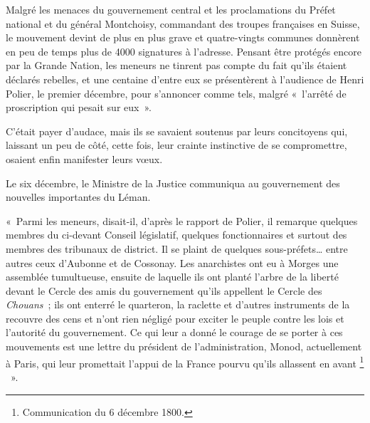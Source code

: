 \documentclass[french,twoside]{book} %
\newenvironment{quoteblock}%
  {\begin{quoting}}
  {\end{quoting}}
\newenvironment{quotebar}{%
    \def\FrameCommand{{\color{rubric!10!}\vrule width 0.5em} \hspace{0.9em}}%
    \def\OuterFrameSep{\itemsep} %
    \MakeFramed {\advance\hsize-\width \FrameRestore}
  }%
  {%
    \endMakeFramed
  }
\renewenvironment{quoteblock}%
  {%
    \savenotes
    \setstretch{0.9}
    \normalfont
    \begin{quotebar}
  }
  {%
    \end{quotebar}
    \spewnotes
  }
\begin{document}
Malgré les menaces du gouvernement central et les proclamations du Préfet national et du général Montchoisy, commandant des troupes françaises en Suisse, le mouvement devint de plus en plus grave et quatre-vingts communes donnèrent en peu de temps plus de 4000 signatures à l’adresse. Pensant être protégés encore par la Grande Nation, les meneurs ne tinrent pas compte du fait qu’ils étaient déclarés rebelles, et une centaine d’entre eux se présentèrent à l’audience de Henri Polier, le premier décembre, pour s’annoncer comme tels, malgré « l’arrêté de proscription qui pesait sur eux ».\par
C’était payer d’audace, mais ils se savaient soutenus par leurs concitoyens qui, laissant un peu de côté, cette fois, leur crainte instinctive de se compromettre, osaient enfin manifester leurs vœux.\par
Le six décembre, le Ministre de la Justice communiqua au gouvernement des nouvelles importantes du Léman.\par

\begin{quoteblock}
 \noindent « Parmi les meneurs, disait-il, d’après le rapport de Polier, il remarque quelques membres du ci-devant Conseil législatif, quelques fonctionnaires et surtout des membres des tribunaux de district. Il se plaint de quelques sous-préfets… entre autres ceux d’Aubonne et de Cossonay. Les anarchistes ont eu à Morges une assemblée tumultueuse, ensuite de laquelle ils ont planté l’arbre de la liberté devant le Cercle des amis du gouvernement qu’ils appellent le Cercle des \emph{Chouans} ; ils ont enterré le quarteron, la raclette et d’autres instruments de la recouvre des cens et n’ont rien négligé pour exciter le peuple contre les lois et l’autorité du gouvernement. Ce qui leur a donné le courage de se porter à ces mouvements est une lettre du président de l’administration, Monod, actuellement à Paris, qui leur promettait l’appui de la France pourvu qu’ils allassent en avant \footnote{Communication du 6 décembre 1800.}  ».
 \end{quoteblock}
\end{document}
